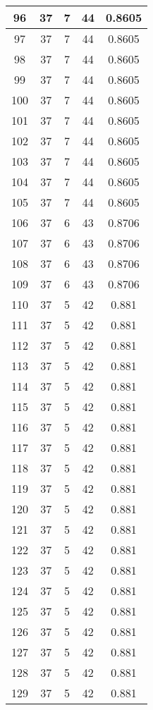 \documentclass[letterpaper, 12pt]{article}
\begin{document}
\begin{longtable}{|c|c|c|c|c|}
\hline
96 & 37 & 7 & 44 & 0.8605 \\
\hline
97 & 37 & 7 & 44 & 0.8605 \\
\hline
98 & 37 & 7 & 44 & 0.8605 \\
\hline
99 & 37 & 7 & 44 & 0.8605 \\
\hline
100 & 37 & 7 & 44 & 0.8605 \\
\hline
101 & 37 & 7 & 44 & 0.8605 \\
\hline
102 & 37 & 7 & 44 & 0.8605 \\
\hline
103 & 37 & 7 & 44 & 0.8605 \\
\hline
104 & 37 & 7 & 44 & 0.8605 \\
\hline
105 & 37 & 7 & 44 & 0.8605 \\
\hline
106 & 37 & 6 & 43 & 0.8706 \\
\hline
107 & 37 & 6 & 43 & 0.8706 \\
\hline
108 & 37 & 6 & 43 & 0.8706 \\
\hline
109 & 37 & 6 & 43 & 0.8706 \\
\hline
110 & 37 & 5 & 42 & 0.881 \\
\hline
111 & 37 & 5 & 42 & 0.881 \\
\hline
112 & 37 & 5 & 42 & 0.881 \\
\hline
113 & 37 & 5 & 42 & 0.881 \\
\hline
114 & 37 & 5 & 42 & 0.881 \\
\hline
115 & 37 & 5 & 42 & 0.881 \\
\hline
116 & 37 & 5 & 42 & 0.881 \\
\hline
117 & 37 & 5 & 42 & 0.881 \\
\hline
118 & 37 & 5 & 42 & 0.881 \\
\hline
119 & 37 & 5 & 42 & 0.881 \\
\hline
120 & 37 & 5 & 42 & 0.881 \\
\hline
121 & 37 & 5 & 42 & 0.881 \\
\hline
122 & 37 & 5 & 42 & 0.881 \\
\hline
123 & 37 & 5 & 42 & 0.881 \\
\hline
124 & 37 & 5 & 42 & 0.881 \\
\hline
125 & 37 & 5 & 42 & 0.881 \\
\hline
126 & 37 & 5 & 42 & 0.881 \\
\hline
127 & 37 & 5 & 42 & 0.881 \\
\hline
128 & 37 & 5 & 42 & 0.881 \\
\hline
129 & 37 & 5 & 42 & 0.881 \\
\hline

\end{longtable}
\end{document}
